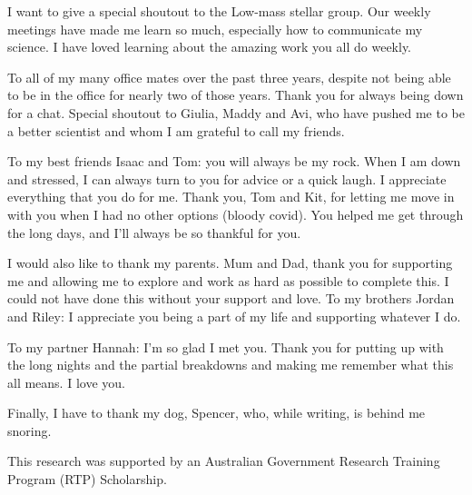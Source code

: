 {I want to give a special shoutout to the Low-mass stellar group. Our weekly meetings have made me learn so much, especially how to communicate my science. I have loved learning about the amazing work you all do weekly.

To all of my many office mates over the past three years, despite not being able to be in the office for nearly two of those years. Thank you for always being down for a chat. Special shoutout to Giulia, Maddy and Avi, who have pushed me to be a better scientist and whom I am grateful to call my friends.

To my best friends Isaac and Tom: you will always be my rock. When I am down and stressed, I can always turn to you for advice or a quick laugh. I appreciate everything that you do for me. Thank you, Tom and Kit, for letting me move in with you when I had no other options (bloody covid). You helped me get through the long days, and I’ll always be so thankful for you. 

I would also like to thank my parents. Mum and Dad, thank you for supporting me and allowing me to explore and work as hard as possible to complete this. I could not have done this without your support and love. To my brothers Jordan and Riley: I appreciate you being a part of my life and supporting whatever I do.

To my partner Hannah: I’m so glad I met you. Thank you for putting up with the long nights and the partial breakdowns and making me remember what this all means. I love you.

Finally, I have to thank my dog, Spencer, who, while writing, is behind me snoring.


This research was supported by an Australian Government Research Training Program (RTP) Scholarship.


}